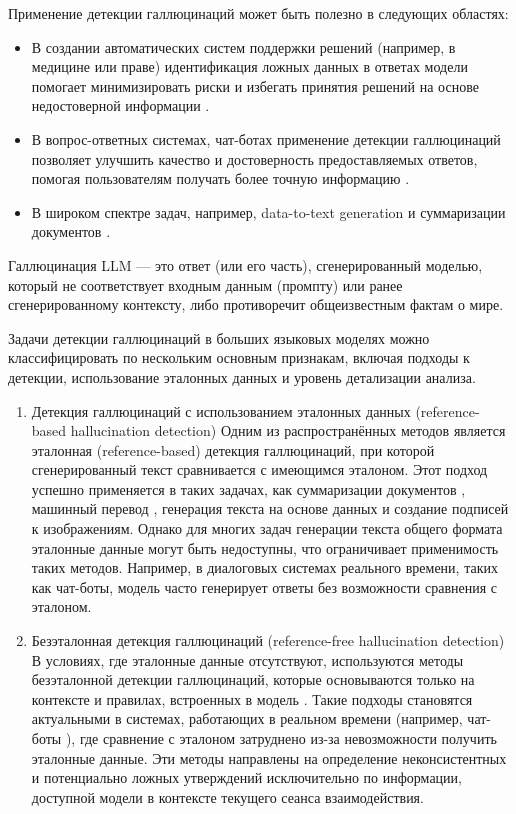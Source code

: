 \documentclass[12pt]{article}
\begin{document}
Применение детекции галлюцинаций может быть полезно в следующих областях:
\begin{itemize}
    \item В создании автоматических систем поддержки решений (например, в медицине или праве) идентификация ложных данных в ответах модели помогает минимизировать риски и избегать принятия решений на основе недостоверной информации \cite{agarwal2024medhalu}.
    \item В вопрос-ответных системах, чат-ботах применение детекции галлюцинаций позволяет улучшить качество и достоверность предоставляемых ответов, помогая пользователям получать более точную информацию \cite{dziri2021neural, li2023halueval}.
    \item В широком спектре задач, например, data-to-text generation \cite{rebuffel2021controlling} и суммаризации документов \cite{cao2021hallucinated}.
\end{itemize}
Галлюцинация LLM — это ответ (или его часть), сгенерированный моделью, который не соответствует входным данным (промпту) или ранее сгенерированному контексту, либо противоречит общеизвестным фактам о мире. 

Задачи детекции галлюцинаций в больших языковых моделях можно классифицировать по нескольким основным признакам, включая подходы к детекции, использование эталонных данных и уровень детализации анализа. 
\begin{enumerate}
\item Детекция галлюцинаций с использованием эталонных данных (reference-based hallucination detection)  
   Одним из распространённых методов является эталонная (reference-based) детекция галлюцинаций, при которой сгенерированный текст сравнивается с имеющимся эталоном. Этот подход успешно применяется в таких задачах, как суммаризации документов \cite{cao2021hallucinated}, машинный перевод \cite{zha2023alignscore}, генерация текста на основе данных \cite{rebuffel2021controlling} и создание подписей к изображениям. Однако для многих задач генерации текста общего формата эталонные данные могут быть недоступны, что ограничивает применимость таких методов. Например, в диалоговых системах реального времени, таких как чат-боты, модель часто генерирует ответы без возможности сравнения с эталоном. 

\item Безэталонная детекция галлюцинаций (reference-free hallucination detection) 
   В условиях, где эталонные данные отсутствуют, используются методы безэталонной детекции галлюцинаций, которые основываются только на контексте и правилах, встроенных в модель \cite{liu2021hades}. Такие подходы становятся актуальными в системах, работающих в реальном времени (например, чат-боты \cite{dziri2021neural, li2023halueval}), где сравнение с эталоном затруднено из-за невозможности получить эталонные данные. Эти методы направлены на определение неконсистентных и потенциально ложных утверждений исключительно по информации, доступной модели в контексте текущего сеанса взаимодействия.
\end{enumerate}
\end{document}
